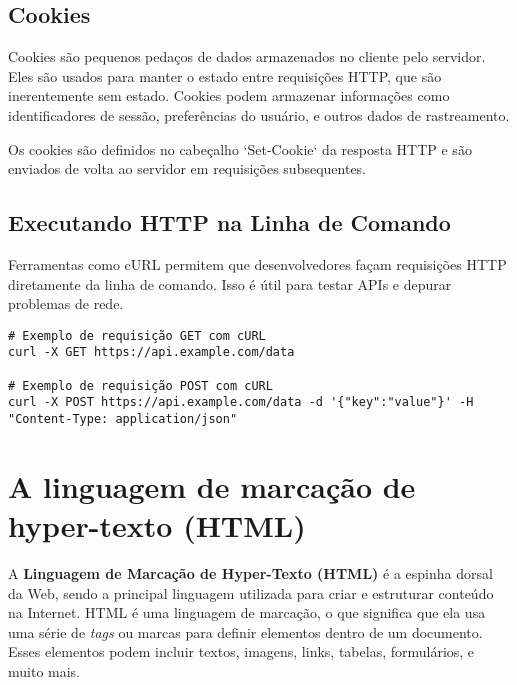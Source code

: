 
\subsection{Cookies}
Cookies são pequenos pedaços de dados armazenados no cliente pelo servidor. Eles são usados para manter o estado entre requisições HTTP, que são inerentemente sem estado. Cookies podem armazenar informações como identificadores de sessão, preferências do usuário, e outros dados de rastreamento.

Os cookies são definidos no cabeçalho `Set-Cookie` da resposta HTTP e são enviados de volta ao servidor em requisições subsequentes.


\subsection{Executando HTTP na Linha de Comando}
Ferramentas como cURL permitem que desenvolvedores façam requisições HTTP diretamente da linha de comando. Isso é útil para testar APIs e depurar problemas de rede.

\begin{verbatim}
# Exemplo de requisição GET com cURL
curl -X GET https://api.example.com/data

# Exemplo de requisição POST com cURL
curl -X POST https://api.example.com/data -d '{"key":"value"}' -H "Content-Type: application/json"
\end{verbatim}



\section{A linguagem de marcação de hyper-texto (HTML)}

A \textbf{Linguagem de Marcação de Hyper-Texto (HTML)} é a espinha dorsal da Web, sendo a principal linguagem utilizada para criar e estruturar conteúdo na Internet. HTML é uma linguagem de marcação, o que significa que ela usa uma série de \textit{tags} ou marcas para definir elementos dentro de um documento. Esses elementos podem incluir textos, imagens, links, tabelas, formulários, e muito mais.

